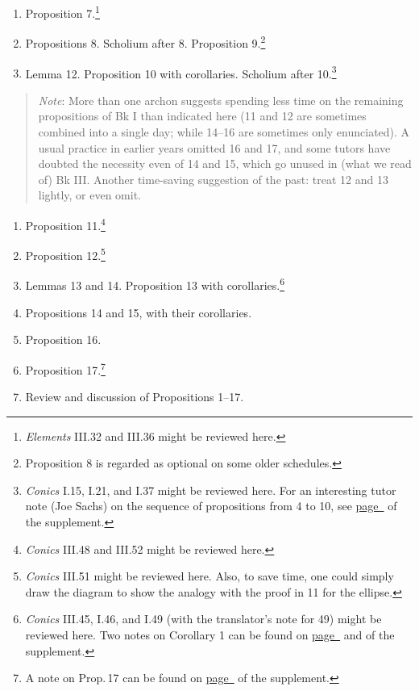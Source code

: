 \documentclass[10pt]{article}
\begin{document}
{\begin{enumerate}[resume*]
{		this indicated in either Bart or Densmore.''}
		  \item
		Proposition 7.\footnote{\emph{Elements}
			III.32 and III.36 might be reviewed
			here.} \item Propositions 8.
		Scholium after 8. Proposition
		9.\footnote{Proposition 8 is regarded as
			optional on some older schedules.}
	\item Lemma 12. Proposition 10 with corollaries.
		Scholium after 10.\footnote{\emph{Conics}
			I.15, I.21, and I.37 might be
			reviewed here. For an interesting
			tutor note (Joe Sachs) on the
			sequence of propositions from 4 to
			10, see
			\hyperref[supple.77]{page~\pageref{supple.77}}
			of the supplement.} \end{enumerate}
\begin{quote} \small{\emph{Note}: More than one archon
		suggests spending less time on the remaining
		propositions of Bk I than indicated here (11
		and 12 are sometimes combined into a single
		day; while 14–16 are sometimes only
		enunciated). A usual practice in earlier
		years omitted 16 and 17, and some tutors
		have doubted the necessity even of 14 and
		15, which go unused in (what we read of) Bk
		III. Another time-saving suggestion of the
		past: treat 12 and 13 lightly, or even
		omit.}  \end{quote}
\begin{enumerate}[resume*] \item Proposition
		11.\footnote{\emph{Conics} III.48 and III.52
			might be reviewed here.} \item
		Proposition 12.\footnote{\emph{Conics}
			III.51 might be reviewed here. Also,
			to save time, one could simply draw
			the diagram to show the analogy with
			the proof in 11 for the ellipse.}
	\item Lemmas 13 and 14. Proposition 13 with
		corollaries.\footnote{\emph{Conics} III.45,
			I.46, and I.49 (with the
			translator's note for 49) might be
			reviewed here. Two notes on Corollary 1 can be
			found on \hyperref[supple.96]{page~\pageref{supple.96}} and \hyperref[supple.98]{\pageref{supple.98}} of the supplement.} \item Propositions
		14 and 15, with their corollaries.  \item
		Proposition 16.  \item Proposition 17.\footnote{A
		note on Prop.\,17 can be found on \hyperref[supple.99]{page~\pageref{supple.99}} of the supplement.}
	\item Review and discussion of Propositions 1--17.

\end{enumerate}}
\end{document}
